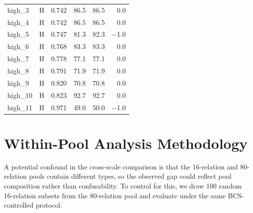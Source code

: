 \documentclass[11pt]{article}
\begin{document}
\begin{table}[h]
{\begin{tabular}{lcrrrr}
high\_3  & H & 0.742 & 86.5 & 86.5 & 0.0 \\
high\_4  & H & 0.742 & 86.5 & 86.5 & 0.0 \\
high\_5  & H & 0.747 & 81.3 & 82.3 & $-$1.0 \\
high\_6  & H & 0.768 & 83.3 & 83.3 & 0.0 \\
high\_7  & H & 0.778 & 77.1 & 77.1 & 0.0 \\
high\_8  & H & 0.791 & 71.9 & 71.9 & 0.0 \\
high\_9  & H & 0.820 & 70.8 & 70.8 & 0.0 \\
high\_10 & H & 0.823 & 92.7 & 92.7 & 0.0 \\
high\_11 & H & 0.971 & 49.0 & 50.0 & $-$1.0 \\
\bottomrule
\end{tabular}}
\end{table}

\section{Within-Pool Analysis Methodology}
\label{app:within-pool-method}

A potential confound in the cross-scale comparison is that the 16-relation and 80-relation pools contain different types, so the observed gap could reflect pool composition rather than confusability. To control for this, we draw 100 random 16-relation subsets from the 80-relation pool and evaluate under the same BCS-controlled protocol.
\end{document}
